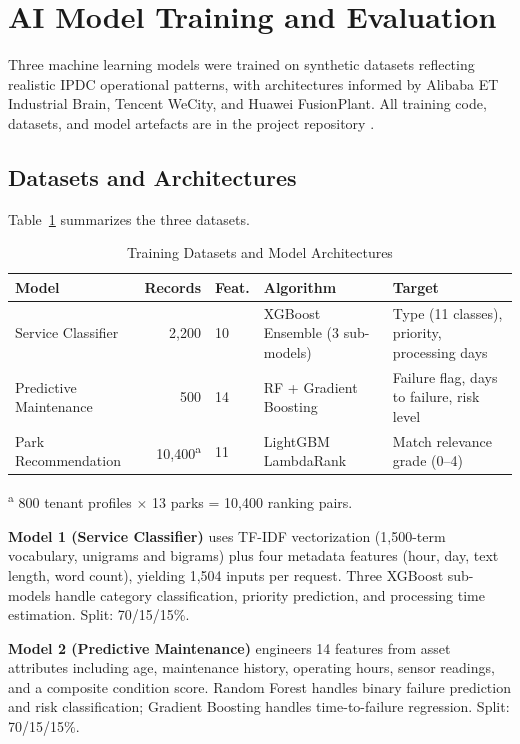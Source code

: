 \section{AI Model Training and Evaluation}

\label{sec:ai-training}

Three machine learning models were trained on synthetic datasets reflecting realistic IPDC operational patterns, with architectures informed by Alibaba ET Industrial Brain, Tencent WeCity, and Huawei FusionPlant. All training code, datasets, and model artefacts are in the project repository \citep{BerhanuIPDC2025}.

\subsection{Datasets and Architectures}

Table~\ref{tab:training-data} summarizes the three datasets.

\begin{table}[H]
\centering
\caption{Training Datasets and Model Architectures}
\label{tab:training-data}
\small
\begin{tabular}{p{3.4cm}rlp{3.2cm}p{3.0cm}}
\toprule
\textbf{Model} & \textbf{Records} & \textbf{Feat.} & \textbf{Algorithm} & \textbf{Target} \\
\midrule
Service Classifier      & 2,200              & 10 & XGBoost Ensemble (3 sub-models) & Type (11 classes), priority, processing days \\
Predictive Maintenance  & 500                & 14 & RF + Gradient Boosting          & Failure flag, days to failure, risk level \\
Park Recommendation     & 10,400\textsuperscript{a} & 11 & LightGBM LambdaRank    & Match relevance grade (0--4) \\
\bottomrule
\end{tabular}
\vspace{0.2cm}
\footnotesize
\textsuperscript{a} 800 tenant profiles $\times$ 13 parks = 10,400 ranking pairs.
\end{table}

\textbf{Model 1 (Service Classifier)} uses TF-IDF vectorization (1,500-term vocabulary, unigrams and bigrams) plus four metadata features (hour, day, text length, word count), yielding 1,504 inputs per request. Three XGBoost sub-models handle category classification, priority prediction, and processing time estimation. Split: 70/15/15\%.

\textbf{Model 2 (Predictive Maintenance)} engineers 14 features from asset attributes including age, maintenance history, operating hours, sensor readings, and a composite condition score. Random Forest handles binary failure prediction and risk classification; Gradient Boosting handles time-to-failure regression. Split: 70/15/15\%.

